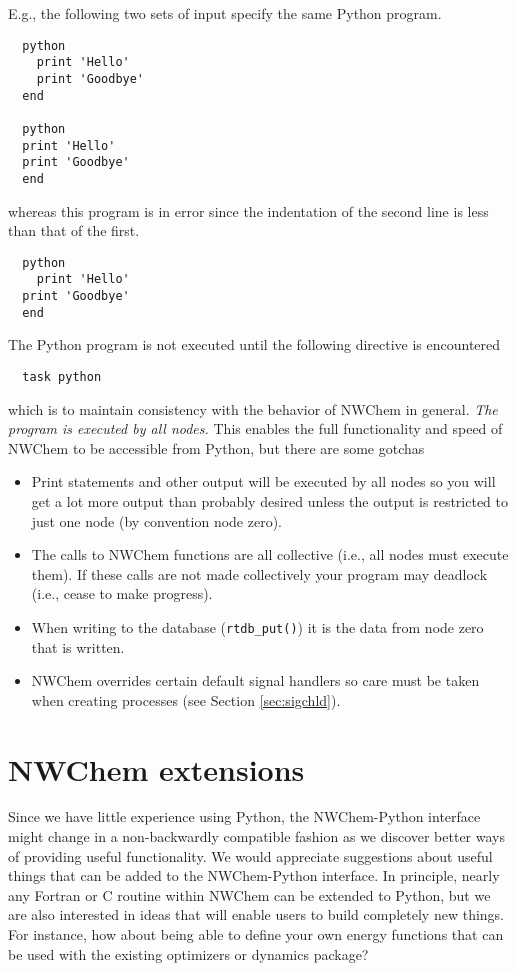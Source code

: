 E.g., the following two sets of input specify the same Python program.
\begin{verbatim}
  python
    print 'Hello'
    print 'Goodbye'
  end

  python
  print 'Hello'
  print 'Goodbye'
  end
\end{verbatim}
whereas this program is in error since the indentation of the second
line is less than that of the first.
\begin{verbatim}
  python
    print 'Hello'
  print 'Goodbye'
  end
\end{verbatim}

The Python program is not executed until the following directive
is encountered
\begin{verbatim}
  task python
\end{verbatim}
which is to maintain consistency with the behavior of NWChem in general.
{\em The program is executed by all nodes.}  This enables the full functionality and speed of NWChem to be accessible from Python, but there are some gotchas
\begin{itemize}
\item Print statements and other output will be executed by all nodes
so you will get a lot more output than probably desired unless the
output is restricted to just one node (by convention node zero).
\item The calls to NWChem functions are all collective (i.e., all
nodes must execute them).  If these calls are not made collectively
your program may deadlock (i.e., cease to make progress).

\item When writing to the database (\verb+rtdb_put()+) it is the data
from node zero that is written.

\item NWChem overrides certain default signal handlers so care
must be taken when creating processes (see Section \ref{sec:sigchld}).
\end{itemize}

\section{NWChem extensions}

Since we have little experience using Python, the NWChem-Python
interface might change in a non-backwardly compatible fashion as we
discover better ways of providing useful functionality.  We would
appreciate suggestions about useful things that can be added to the
NWChem-Python interface.  In principle, nearly any Fortran or C
routine within NWChem can be extended to Python, but we are also
interested in ideas that will enable users to build completely new
things.  For instance, how about being able to define your own energy
functions that can be used with the existing optimizers or dynamics
package?


